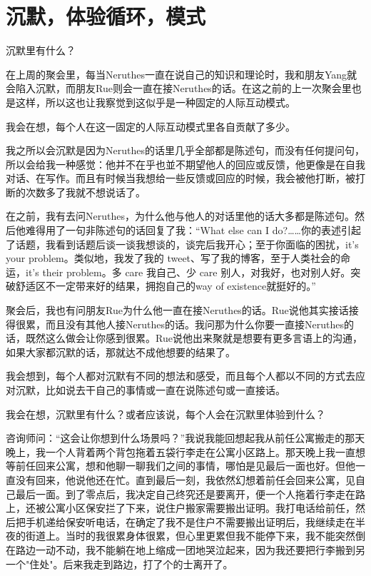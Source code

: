 \chapter{沉默，体验循环，模式}




沉默里有什么？

在上周的聚会里，每当Neruthes一直在说自己的知识和理论时，我和朋友Yang就会陷入沉默，而朋友Rue则会一直在接Neruthes的话。在这之前的上一次聚会里也是这样，所以这也让我察觉到这似乎是一种固定的人际互动模式。

我会在想，每个人在这一固定的人际互动模式里各自贡献了多少。

我之所以会沉默是因为Neruthes的话里几乎全部都是陈述句，而没有任何提问句，所以会给我一种感觉：他并不在乎也並不期望他人的回应或反馈，他更像是在自我对话、在写作。而且有时候当我想给一些反馈或回应的时候，我会被他打断，被打断的次数多了我就不想说话了。

在之前，我有去问Neruthes，为什么他与他人的对话里他的话大多都是陈述句。然后他难得用了一句非陈述句的话回复了我：“What else can I do?……你的表述引起了话题，我看到话题后谈一谈我想谈的，谈完后我开心；至于你面临的困扰，it's your problem。类似地，我发了我的 tweet、写了我的博客，至于人类社会的命运，it's their problem。多 care 我自己、少 care 别人，对我好，也对别人好。突破舒适区不一定带来好的结果，拥抱自己的way of existence就挺好的。”

聚会后，我也有问朋友Rue为什么他一直在接Neruthes的话。Rue说他其实接话接得很累，而且没有其他人接Neruthes的话。我问那为什么你要一直接Neruthes的话，既然这么做会让你感到很累。Rue说他出来聚就是想要有更多言语上的沟通，如果大家都沉默的话，那就达不成他想要的结果了。

我会想到，每个人都对沉默有不同的想法和感受，而且每个人都以不同的方式去应对沉默，比如说去干自己的事情或一直在说陈述句或一直接话。

我会在想，沉默里有什么？或者应该说，每个人会在沉默里体验到什么？

咨询师问：“这会让你想到什么场景吗？”我说我能回想起我从前任公寓搬走的那天晚上，我一个人背着两个背包拖着五袋行李走在公寓小区路上。那天晚上我一直想等前任回来公寓，想和他聊一聊我们之间的事情，哪怕是见最后一面也好。但他一直没有回来，他说他还在忙。直到最后一刻，我依然幻想着前任会回来公寓，见自己最后一面。到了零点后，我决定自己终究还是要离开，便一个人拖着行李走在路上，还被公寓小区保安拦了下来，说住户搬家需要搬出证明。我打电话给前任，然后把手机递给保安听电话，在确定了我不是住户不需要搬出证明后，我继续走在半夜的街道上。当时的我很累\pozhehao{}身体很累，但心里更累\pozhehao{}但我不能停下来，我不能突然倒在路边一动不动，我不能躺在地上缩成一团地哭泣起来，因为我还要把行李搬到另一个"住处"。后来我走到路边，打了个的士离开了。

